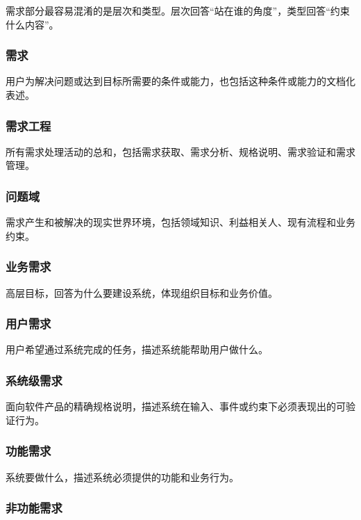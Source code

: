 \documentclass[UTF8,zihao=-4]{ctexart}
\begin{document}
需求部分最容易混淆的是层次和类型。层次回答“站在谁的角度”，类型回答“约束什么内容”。


\subsubsection*{需求}


用户为解决问题或达到目标所需要的条件或能力，也包括这种条件或能力的文档化表述。


\subsubsection*{需求工程}


所有需求处理活动的总和，包括需求获取、需求分析、规格说明、需求验证和需求管理。


\subsubsection*{问题域}


需求产生和被解决的现实世界环境，包括领域知识、利益相关人、现有流程和业务约束。


\subsubsection*{业务需求}


高层目标，回答为什么要建设系统，体现组织目标和业务价值。


\subsubsection*{用户需求}


用户希望通过系统完成的任务，描述系统能帮助用户做什么。


\subsubsection*{系统级需求}


面向软件产品的精确规格说明，描述系统在输入、事件或约束下必须表现出的可验证行为。


\subsubsection*{功能需求}


系统要做什么，描述系统必须提供的功能和业务行为。


\subsubsection*{非功能需求}
\end{document}
